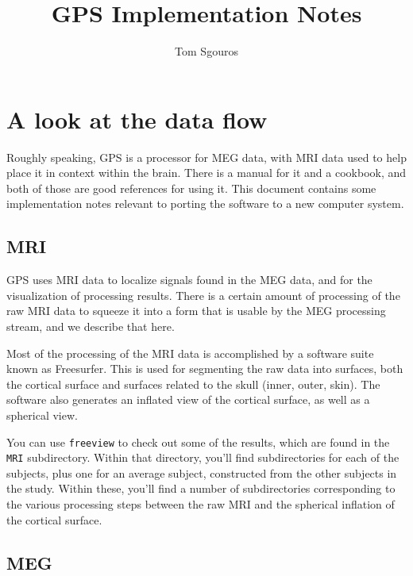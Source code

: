 \documentclass[11pt]{article}
\begin{document}
\title{GPS Implementation Notes}
\author{Tom Sgouros}

\newcommand{\dir}[1]{\texttt{#1}}
\newcommand{\exec}[1]{\texttt{#1}}

\newcommand{\fs}{Freesurfer\xspace}

\maketitle

\section{A look at the data flow}

Roughly speaking, GPS is a processor for MEG data, with MRI data used
to help place it in context within the brain.  There is a manual for
it and a cookbook, and both of those are good references for using
it.  This document contains some implementation notes relevant to
porting the software to a new computer system.


\subsection{MRI}

GPS uses MRI data to localize signals found in the MEG data, and for
the visualization of processing results.  There is a certain amount of
processing of the raw MRI data to squeeze it into a form that is
usable by the MEG processing stream, and we describe that here.

Most of the processing of the MRI data is accomplished by a software
suite known as \fs.  This is used for segmenting the raw data
into surfaces, both the cortical surface and surfaces related to the
skull (inner, outer, skin).  The software also generates an inflated
view of the cortical surface, as well as a spherical view.

You can use \exec{freeview} to check out some of the results, which
are found in the \dir{MRI} subdirectory.  Within that directory,
you'll find subdirectories for each of the subjects, plus one for an
average subject, constructed from the other subjects in the study.
Within these, you'll find a number of subdirectories corresponding to
the various processing steps between the raw MRI and the spherical
inflation of the cortical surface.

\subsection{MEG}
\end{document}

